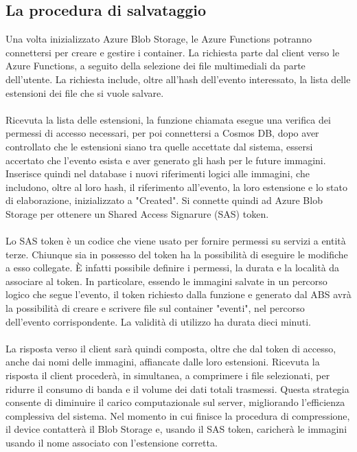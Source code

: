 \subsection{La procedura di salvataggio}

Una volta inizializzato Azure Blob Storage, le Azure Functions potranno connettersi per 
creare e gestire i container.
La richiesta parte dal client verso le Azure Functions, 
a seguito della selezione dei file multimediali da parte dell'utente.
La richiesta include, oltre all'hash dell'evento interessato, la lista delle estensioni dei file che si vuole salvare.\\
\\
Ricevuta la lista delle estensioni, 
la funzione chiamata esegue una verifica dei permessi di accesso necessari,
per poi connettersi a Cosmos DB, 
dopo aver controllato che le estensioni siano tra quelle accettate dal sistema,
essersi accertato che l'evento esista e aver generato gli hash per le future immagini.
Inserisce quindi nel database i nuovi riferimenti logici alle immagini,
che includono, oltre al loro hash, il riferimento all'evento, la loro estensione
e lo stato di elaborazione, inizializzato a "Created".
Si connette quindi ad Azure Blob Storage per ottenere un Shared Access Signarure (SAS) token.\\
\\
Lo SAS token è un codice che viene usato per fornire permessi su servizi a entità terze.
Chiunque sia in possesso del token ha la possibilità di eseguire le modifiche a esso collegate. 
È infatti possibile definire i permessi, la durata e la località da associare al token.
In particolare, essendo le immagini salvate in un percorso logico che segue l'evento,
il token richiesto dalla funzione e generato dal ABS 
avrà la possibilità di creare e scrivere file sul container "eventi", 
nel percorso dell'evento corrispondente.
La validità di utilizzo ha durata dieci minuti.\\
\\
La risposta verso il client sarà quindi composta, oltre che dal token di accesso, 
anche dai nomi delle immagini, affiancate dalle loro estensioni.
Ricevuta la risposta il client procederà, in simultanea, 
a comprimere i file selezionati, 
per ridurre il consumo di banda e il volume dei dati totali trasmessi.
Questa strategia consente di diminuire il carico computazionale sul server, 
migliorando l’efficienza complessiva del sistema.
Nel momento in cui finisce la procedura di compressione, il device contatterà il Blob Storage e,
usando il SAS token, caricherà le immagini usando il nome associato con l'estensione corretta.\\
